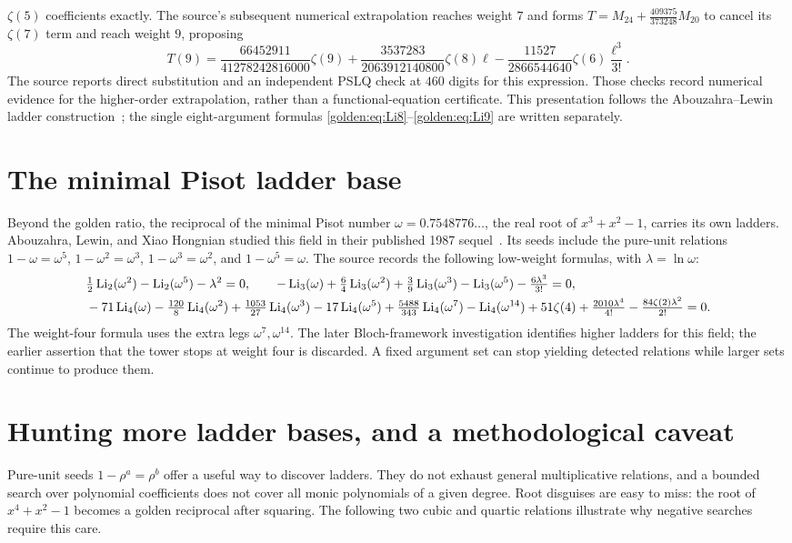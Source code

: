 $\zeta(5)$ coefficients exactly. The source's subsequent numerical
extrapolation reaches weight $7$ and forms
$T=M_{24}+\tfrac{409375}{373248}M_{20}$ to cancel its
$\zeta(7)$ term and reach weight $9$, proposing
\[
T(9)=\frac{66452911}{41278242816000}\zeta(9)
 +\frac{3537283}{2063912140800}\zeta(8)\ell
 -\frac{11527}{2866544640}\zeta(6)\frac{\ell^3}{3!}.
\]
The source reports direct substitution and an independent PSLQ check at
$460$ digits for this expression. Those checks record numerical evidence
for the higher-order extrapolation, rather than a functional-equation
certificate. This presentation follows the Abouzahra--Lewin ladder
construction~\cite{golden:AbouzahraLewin1985}; the single eight-argument
formulas \eqref{golden:eq:Li8}--\eqref{golden:eq:Li9} are written separately.

\section{The minimal Pisot ladder base}
Beyond the golden ratio, the reciprocal of the minimal Pisot number
$\omega=0.7548776\ldots$, the real root of $x^3+x^2-1$, carries its
own ladders. Abouzahra, Lewin, and Xiao Hongnian studied this field in
their published 1987 sequel~\cite{golden:AbouzahraLewinXiao1987}.
Its seeds include the pure-unit relations
$1-\omega=\omega^5$, $1-\omega^2=\omega^3$,
$1-\omega^3=\omega^2$, and $1-\omega^5=\omega$.
The source records the following low-weight formulas, with
$\lambda=\ln\omega$:
{\footnotesize
\begin{align*}
  &\tfrac12\operatorname{Li}_2(\omega^2)-\operatorname{Li}_2(\omega^5)-\lambda^2=0,\qquad
  -\operatorname{Li}_3(\omega)+\tfrac64\operatorname{Li}_3(\omega^2)+\tfrac39\operatorname{Li}_3(\omega^3)-\operatorname{Li}_3(\omega^5)-\tfrac{6\lambda^3}{3!}=0,\\
  &-71\operatorname{Li}_4(\omega)-\tfrac{120}8\operatorname{Li}_4(\omega^2)+\tfrac{1053}{27}\operatorname{Li}_4(\omega^3)-17\operatorname{Li}_4(\omega^5)+\tfrac{5488}{343}\operatorname{Li}_4(\omega^7)-\operatorname{Li}_4(\omega^{14})+51\zeta(4)+\tfrac{2010\lambda^4}{4!}-\tfrac{84\zeta(2)\lambda^2}{2!}=0.
\end{align*}}
The weight-four formula uses the extra legs $\omega^7,\omega^{14}$.
The later Bloch-framework investigation identifies higher ladders for this
field; the earlier assertion that the tower stops at weight four is
discarded. A fixed argument set can stop yielding detected relations while
larger sets continue to produce them.

\section{Hunting more ladder bases, and a methodological caveat}
Pure-unit seeds $1-\rho^a=\rho^b$ offer a useful way to discover ladders.
They do not exhaust general multiplicative relations, and a bounded search
over polynomial coefficients does not cover all monic polynomials of a
given degree. Root disguises are easy to miss: the root of $x^4+x^2-1$
becomes a golden reciprocal after squaring. The following two cubic and
quartic relations illustrate why negative searches require this care.

